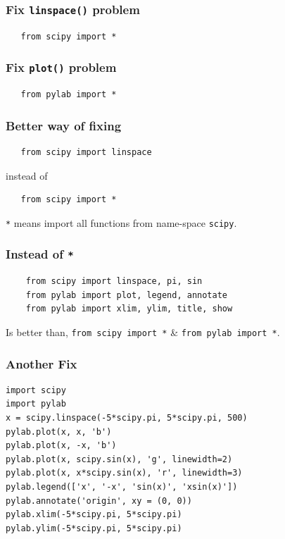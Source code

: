 \documentclass[presentation]{beamer}
\begin{document}
\begin{frame}[fragile]
\frametitle{Fix \verb~linspace()~ problem}
\label{sec-7}

\begin{verbatim}
   from scipy import *
\end{verbatim}
\end{frame}
\begin{frame}[fragile]
\frametitle{Fix \verb~plot()~ problem}
\label{sec-8}

\begin{verbatim}
   from pylab import *
\end{verbatim}
\end{frame}
\begin{frame}[fragile]
\frametitle{Better way of fixing}
\label{sec-9}

\begin{verbatim}
   from scipy import linspace
\end{verbatim}

  instead of
\begin{verbatim}
   from scipy import *
\end{verbatim}

    \verb~*~ means import all functions from name-space \verb~scipy~.
\end{frame}
\begin{frame}[fragile]
\frametitle{Instead of \verb~*~}
\label{sec-10}

\begin{verbatim}
    from scipy import linspace, pi, sin
    from pylab import plot, legend, annotate
    from pylab import xlim, ylim, title, show
\end{verbatim}

  Is better than, \verb~from scipy import *~ \& \verb~from pylab import *~.
\end{frame}
\begin{frame}[fragile]
\frametitle{Another Fix}
\label{sec-11}

\lstset{language=Python}
\begin{lstlisting}
import scipy
import pylab
x = scipy.linspace(-5*scipy.pi, 5*scipy.pi, 500)
pylab.plot(x, x, 'b')
pylab.plot(x, -x, 'b')
pylab.plot(x, scipy.sin(x), 'g', linewidth=2)
pylab.plot(x, x*scipy.sin(x), 'r', linewidth=3)
pylab.legend(['x', '-x', 'sin(x)', 'xsin(x)'])
pylab.annotate('origin', xy = (0, 0))
pylab.xlim(-5*scipy.pi, 5*scipy.pi)
pylab.ylim(-5*scipy.pi, 5*scipy.pi)
\end{lstlisting}
\end{frame}
\end{document}
